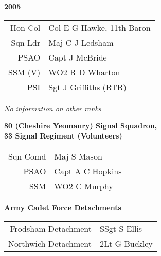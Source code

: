 \begin{center}
  \Huge
  \textbf{2005}
\end{center}

\begin{center}
  \small
  \begin{tabular}{rl}
    Hon Col & Col E G Hawke, 11th Baron \\
    Sqn Ldr & Maj C J Ledsham \\
    PSAO & Capt J McBride \\
    SSM (V) & WO2 R D Wharton \\
    PSI & Sgt J Griffiths (RTR) \\
  \end{tabular}
\end{center}

\begin{center}
  \textit{No information on other ranks}
\end{center}

\begin{center}
  \Large
  \textbf{80 (Cheshire Yeomanry) Signal Squadron, \\ 33 Signal Regiment (Volunteers)}
\end{center}

\begin{center}
  \small
  \begin{tabular}{rl}
    Sqn Comd & Maj S Mason \\
    PSAO & Capt A C Hopkins \\
    SSM & WO2 C Murphy \\
  \end{tabular}
\end{center}

\begin{center}
  \Large
  \textbf{Army Cadet Force Detachments}
\end{center}

\begin{center}
  \small
  \begin{tabular}{rl}
    Frodsham Detachment & SSgt S Ellis \\
    Northwich Detachment & 2Lt G Buckley \\
  \end{tabular}
\end{center}

\vspace{50mm}

\pagebreak
